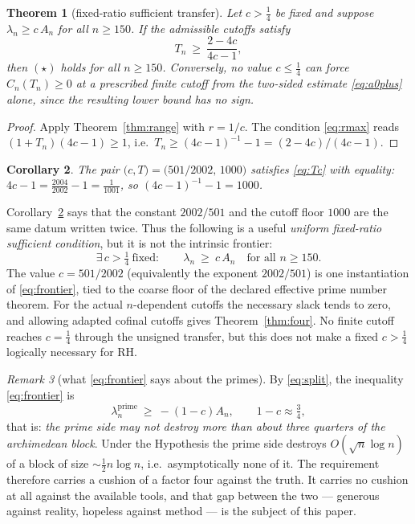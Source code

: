 \documentclass[11pt]{amsart}
\newtheorem{theorem}{Theorem}[section]
\newtheorem{corollary}[theorem]{Corollary}
\theoremstyle{definition}
\theoremstyle{remark}
\newtheorem{remark}[theorem]{Remark}
\theoremstyle{definition}
\begin{document}
\begin{theorem}[fixed-ratio sufficient transfer]\label{thm:scalefree}
Let $c>\tfrac14$ be fixed and suppose $\lambda_n\ge c\,A_n$ for all $n\ge150$. If the admissible
cutoffs satisfy
\begin{equation}\label{eq:Tc}
   T_n\ \ge\ \frac{2-4c}{4c-1},
\end{equation}
then $(\star)$ holds for all $n\ge150$. Conversely, no value $c\le\tfrac14$ can force
$C_n(T_n)\ge0$ at a prescribed finite cutoff from the two-sided estimate
\eqref{eq:a0plus} alone, since the resulting lower bound has no sign.
\end{theorem}

\begin{proof}
Apply Theorem~\ref{thm:range} with $r=1/c$. The condition \eqref{eq:rmax} reads
$(1+T_n)(4c-1)\ge1$, i.e.\ $T_n\ge(4c-1)^{-1}-1=(2-4c)/(4c-1)$.
\end{proof}

\begin{corollary}\label{cor:1000}
The pair $\bigl(c,T\bigr)=\bigl(501/2002,\,1000\bigr)$ satisfies \eqref{eq:Tc} with equality:
$4c-1=\tfrac{2004}{2002}-1=\tfrac{1}{1001}$, so $(4c-1)^{-1}-1=1000$.
\end{corollary}

Corollary~\ref{cor:1000} says that the constant $2002/501$ and the cutoff floor $1000$ are the
same datum written twice.  Thus the following is a useful \emph{uniform fixed-ratio sufficient
condition}, but it is not the intrinsic frontier:
\begin{equation}\label{eq:frontier}
   \boxed{\ \exists\,c>\tfrac14\ \text{fixed}:\qquad
   \lambda_n\ \ge\ c\,A_n\quad\text{for all }n\ge150 .\ }
\end{equation}
The value $c=501/2002$ (equivalently the exponent $2002/501$) is one instantiation of
\eqref{eq:frontier}, tied to the coarse floor of the declared effective prime number theorem.
For the actual $n$-dependent cutoffs the necessary slack tends to zero, and allowing adapted
cofinal cutoffs gives Theorem~\ref{thm:four}.  No finite cutoff reaches $c=\tfrac14$ through the
unsigned transfer, but this does not make a fixed $c>\tfrac14$ logically necessary for RH.

\begin{remark}[what \eqref{eq:frontier} says about the primes]\label{rmk:75}
By \eqref{eq:split}, the inequality \eqref{eq:frontier} is
\[
   \lambda_n^{\mathrm{prime}}\ \ge\ -(1-c)A_n,
   \qquad 1-c\approx\tfrac34 ,
\]
that is: \emph{the prime side may not destroy more than about three quarters of the archimedean
block}. Under the Hypothesis the prime side destroys $O(\sqrt n\log n)$ of a block of size
$\sim\tfrac12n\log n$, i.e.\ asymptotically none of it. The requirement therefore carries a
cushion of a factor four against the truth. It carries no cushion at all against the available
tools, and that gap between the two --- generous against reality, hopeless against method --- is
the subject of this paper.
\end{remark}
\end{document}
